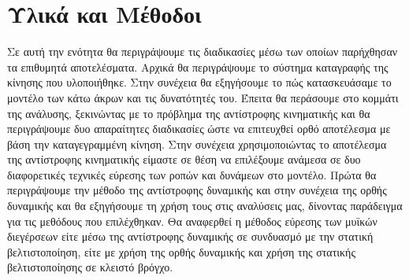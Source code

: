 \chapter{Υλικά και Μέθοδοι}

Σε αυτή την ενότητα θα περιγράψουμε τις διαδικασίες μέσω των οποίων παρήχθησαν τα επιθυμητά αποτελέσματα. Αρχικά θα περιγράψουμε το σύστημα καταγραφής της κίνησης που υλοποιήθηκε. Στην συνέχεια θα εξηγήσουμε το πώς κατασκευάσαμε το μοντέλο των κάτω άκρων και τις δυνατότητές του. Έπειτα θα περάσουμε στο κομμάτι της ανάλυσης, ξεκινώντας με το πρόβλημα της αντίστροφης κινηματικής και θα περιγράψουμε δυο απαραίτητες διαδικασίες ώστε να επιτευχθεί ορθό αποτέλεσμα με βάση την καταγεγραμμένη κίνηση. Στην συνέχεια χρησιμοποιώντας το αποτέλεσμα της αντίστροφης κινηματικής είμαστε σε θέση να επιλέξουμε ανάμεσα σε δυο διαφορετικές τεχνικές εύρεσης των ροπών και δυνάμεων στο μοντέλο. Πρώτα θα περιγράψουμε την μέθοδο της αντίστροφης δυναμικής και στην συνέχεια της ορθής δυναμικής και θα εξηγήσουμε τη χρήση τους στις αναλύσεις μας, δίνοντας παράδειγμα για τις μεθόδους που επιλέχθηκαν. Θα αναφερθεί η μέθοδος εύρεσης των μυϊκών διεγέρσεων είτε μέσω της αντίστροφης δυναμικής σε συνδυασμό με την στατική βελτιστοποίηση, είτε με χρήση της ορθής δυναμικής και χρήση της στατικής βελτιστοποίησης σε κλειστό βρόγχο.

%


